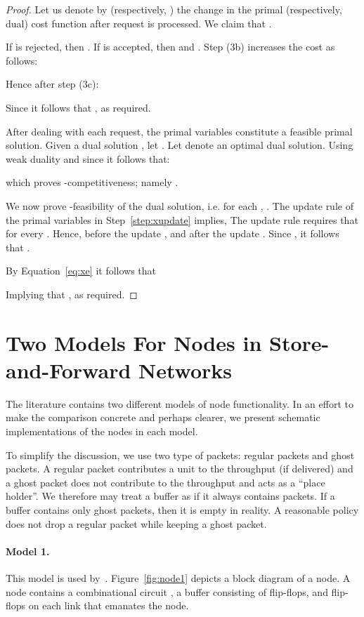 \documentclass[11pt]{article}
\newenvironment{proof sketch}[1]{\noindent {\emph{Proof sketch of #1:}}}{\hfill \qed}
\begin{document}
\begin{proof}Let us denote by  (respectively, ) the change in the primal
  (respectively, dual) cost function after request  is processed.
We claim that .

If  is rejected, then .  If  is accepted, then
 and .  Step (3b) increases the cost  as follows:
    

Hence after step (3c):


Since  it follows that , as
required.

After dealing with each request, the primal variables  constitute a feasible primal solution. Given a dual solution
, let . Let 
denote an optimal dual solution.  Using weak duality and since  it follows that:
        
    which proves -competitiveness; namely .

    We now prove -feasibility of the dual solution, i.e. for each , .
    The update rule of the primal variables  in Step~\ref{step:xupdate} implies,
      The update rule requires that  for every .  Hence, before the
     update , and after the update .  Since , it follows that .

By Equation~\eqref{eq:xe} it follows that
    
    Implying that , as required.
\end{proof}


\section{Two Models For Nodes in Store-and-Forward Networks}\label{sec:model}
\newcommand{\comb}{\text{\emph{comb}}} The literature contains two
different models of node functionality. In an effort to make the
comparison concrete and perhaps clearer, we present schematic
implementations of the nodes in each model.

To simplify the discussion, we use two type of packets: regular packets and ghost
packets. A regular packet contributes a unit to the throughput (if delivered) and a
ghost packet does not contribute to the throughput and acts as a ``place holder''.
We therefore may treat a buffer as if it always contains  packets.
If a buffer contains only ghost packets, then it is empty in reality.
A reasonable policy does not drop a regular packet while keeping a ghost packet.

\paragraph{Model 1.}
This model is used by~\cite{ARSU,RR}. Figure~\ref{fig:node1}
depicts a block diagram of a node. A node contains a combinational
circuit \comb, a buffer consisting of  flip-flops, and 
flip-flops on each  link that emanates the node.
\end{document}
